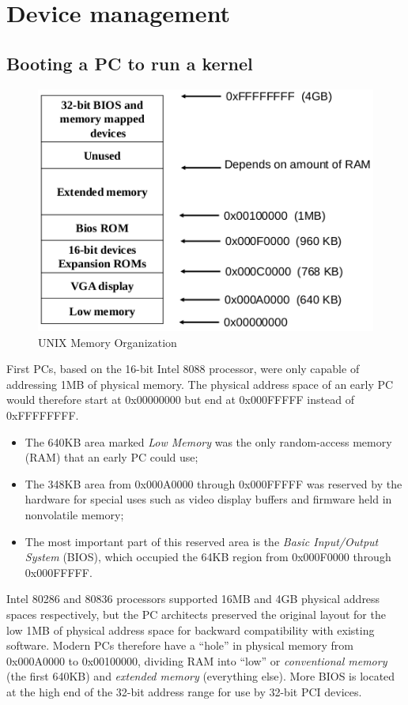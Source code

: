 \chapter{Device management}
\section{Booting a PC to run a kernel}
\begin{figure}[hbtp]
\centering
\includegraphics[scale=0.4]{images/device_management/booting_memory.png}
\caption{UNIX Memory Organization}
\end{figure}

First PCs, based on the 16-bit Intel 8088 processor, were only capable of addressing 1MB of physical memory. The physical address space of an early PC would therefore start at 0x00000000 but end at 0x000FFFFF instead of 0xFFFFFFFF.
\begin{itemize}
\item The 640KB area marked \emph{Low Memory} was the only random-access memory (RAM) that an early PC could use;
\item The 348KB area from 0x000A0000 through 0x000FFFFF was reserved by the hardware for special uses such as video display buffers and firmware held in nonvolatile memory;
\item The most important part of this reserved area is the \emph{Basic Input/Output System} (BIOS), which occupied the 64KB region from 0x000F0000 through 0x000FFFFF.
\end{itemize}

Intel 80286 and 80836 processors supported 16MB and 4GB physical address spaces respectively, but the PC architects preserved the original layout for the low 1MB of physical address space for backward compatibility with existing software. Modern PCs therefore have a ``hole'' in physical memory from 0x000A0000 to 0x00100000, dividing RAM into ``low'' or \emph{conventional memory} (the first 640KB) and \emph{extended memory} (everything else).
More BIOS is located at the high end of the 32-bit address range for use by 32-bit PCI devices.

